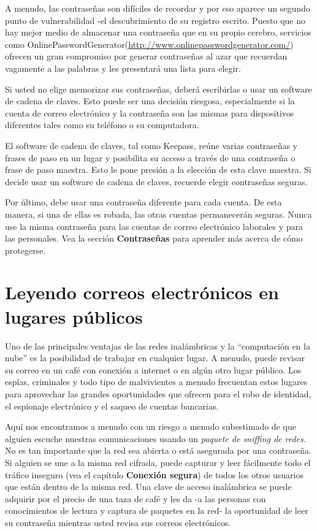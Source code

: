\documentclass[10pt,a5paper,twoside,,]{book}
\begin{document}
A menudo, las contraseñas son difíciles de recordar y por eso aparece un
segundo punto de vulnerabilidad -el descubrimiento de su registro
escrito. Puesto que no hay mejor medio de almacenar una contraseña que
en su propio cerebro, servicios como
OnlinePasswordGenerator(\url{http://www.onlinepasswordgenerator.com/})
ofrecen un gran compromiso por generar contraseñas al azar que recuerdan
vagamente a las palabras y les presentará una lista para elegir.

Si usted no elige memorizar sus contraseñas, deberá escribirlas o usar
un software de cadena de claves. Esto puede ser una decisión riesgosa,
especialmente si la cuenta de correo electrónico y la contraseña son las
mismas para dispositivos diferentes tales como su teléfono o su
computadora.

El software de cadena de claves, tal como Keepass, reúne varias
contraseñas y frases de paso en un lugar y posibilita su acceso a través
de una contraseña o frase de paso maestra. Esto le pone presión a la
elección de esta clave maestra. Si decide usar un software de cadena de
claves, recuerde elegir contraseñas seguras.

Por último, debe usar una contraseña diferente para cada cuenta. De esta
manera, si una de ellas es robada, las otras cuentas permanecerán
seguras. Nunca use la misma contraseña para las cuentas de correo
electrónico laborales y para las personales. Vea la sección
\textbf{Contraseñas} para aprender más acerca de cómo protegerse.

\section{Leyendo correos electrónicos en lugares
públicos}\label{leyendo-correos-electruxf3nicos-en-lugares-puxfablicos}

Uno de las principales ventajas de las redes inalámbricas y la
``computación en la nube'' es la posibilidad de trabajar en cualquier
lugar. A menudo, puede revisar su correo en un café con conexión a
internet o en algún otro lugar público. Los espías, criminales y todo
tipo de malvivientes a menudo frecuentan estos lugares para aprovechar
las grandes oportunidades que ofrecen para el robo de identidad, el
espionaje electrónico y el saqueo de cuentas bancarias.

Aquí nos encontramos a menudo con un riesgo a menudo subestimado de que
alguien escuche nuestras comunicaciones usando un \emph{paquete de
sniffing de redes}. No es tan importante que la red sea abierta o está
asegurada por una contraseña. Si alguien se une a la misma red cifrada,
puede capturar y leer fácilmente todo el tráfico inseguro (vea el
capítulo \textbf{Conexión segura}) de todos los otros usuarios que están
dentro de la misma red. Una clave de acceso inalámbrica se puede
adquirir por el precio de una taza de café y les da -a las personas con
conocimientos de lectura y captura de paquetes en la red- la oportunidad
de leer su contraseña mientras usted revisa sus correos electrónicos.
\end{document}
